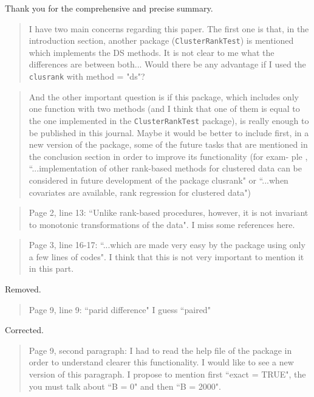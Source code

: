 \documentclass[12pt]{article}
\newenvironment{comment}%
{\begin{quotation}\noindent\small\it\ignorespaces%
  }{\end{quotation}}
\begin{document}
Thank you for the comprehensive and precise summary.

\begin{comment}
I have two main concerns regarding this paper. The first one is that, in
the introduction section, another package (\texttt{ClusterRankTest}) is
mentioned which implements the DS methods. It is not clear to me what the
differences are between both... Would there be any advantage if I used the
\texttt{clusrank} with method = "ds"?
\end{comment}



\begin{comment}
And the other important question is if this package, which includes only one function
with two methods (and I think that one of them is equal to the one implemented in the
\texttt{ClusterRankTest} package), is really enough to be published in this journal. Maybe it
would be better to include first, in a new version of the package, some of the future tasks
that are mentioned in the conclusion section in order to improve its functionality (for exam-
ple , ``...implementation of other rank-based methods for clustered data can be considered
in future development of the package clusrank" or ``...when covariates are available, rank
regression for clustered data")
\end{comment}

\begin{comment}
Page 2, line 13: ``Unlike rank-based procedures, however, it is not
invariant to monotonic transformations of the data". I miss some
references here.
\end{comment}

\citet{Datt:Satt:rank:2005}

\begin{comment}
Page 3, line 16-17: ``...which are made very easy by the package using only a few
lines of codes". I think that this is not very important to mention it in this part.
\end{comment}

Removed.

\begin{comment}
Page 9, line 9: ``parid difference" I guess ``paired"
\end{comment}

Corrected.

\begin{comment}
Page 9, second paragraph: I had to read the help file of the package in
order to understand clearer this functionality.
I would like to see a new version of this paragraph.
I propose to mention first ``exact = TRUE", the you must talk about ``B = 0" and
then ``B = 2000".
\end{comment}
\end{document}
